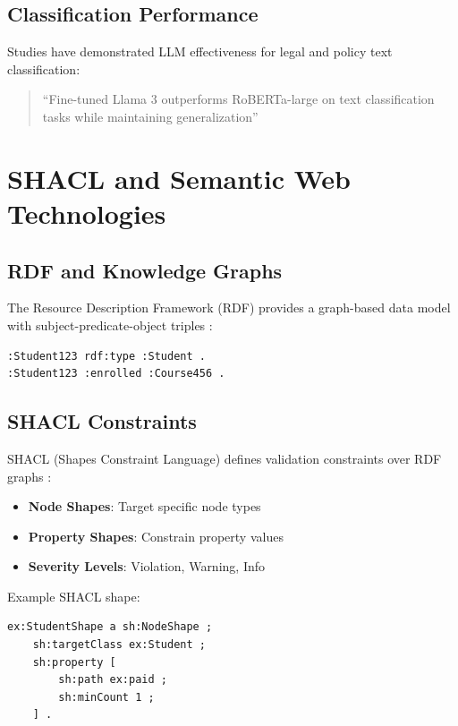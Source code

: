 \subsection{Classification Performance}

Studies have demonstrated LLM effectiveness for legal and policy text classification:

\begin{quote}
``Fine-tuned Llama 3 outperforms RoBERTa-large on text classification tasks while maintaining generalization'' \cite{meta2024llama}
\end{quote}

\section{SHACL and Semantic Web Technologies}

\subsection{RDF and Knowledge Graphs}

The Resource Description Framework (RDF) provides a graph-based data model with subject-predicate-object triples \cite{w3c2014rdf}:

\begin{verbatim}
:Student123 rdf:type :Student .
:Student123 :enrolled :Course456 .
\end{verbatim}

\subsection{SHACL Constraints}

SHACL (Shapes Constraint Language) defines validation constraints over RDF graphs \cite{w3c2017shacl}:

\begin{itemize}
    \item \textbf{Node Shapes}: Target specific node types
    \item \textbf{Property Shapes}: Constrain property values
    \item \textbf{Severity Levels}: Violation, Warning, Info
\end{itemize}

Example SHACL shape:
\begin{verbatim}
ex:StudentShape a sh:NodeShape ;
    sh:targetClass ex:Student ;
    sh:property [
        sh:path ex:paid ;
        sh:minCount 1 ;
    ] .
\end{verbatim}

